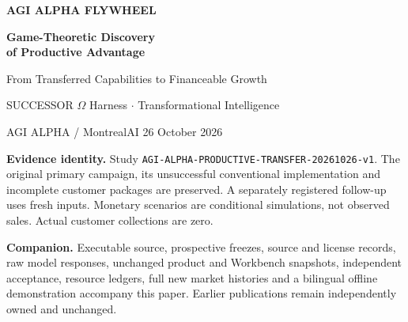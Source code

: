 \documentclass[11pt,a4paper]{article}
\begin{document}
\hypersetup{pageanchor=false}
\begin{titlepage}
\thispagestyle{empty}
\vspace*{12mm}
{\large\bfseries\color{cyan}AGI ALPHA FLYWHEEL}\par
\vspace{8mm}
{\Huge\bfseries\color{cosmic}Game-Theoretic Discovery\\of Productive Advantage}\par
\vspace{6mm}
{\LARGE From Transferred Capabilities to Financeable Growth}\par
\vspace{8mm}
{\large SUCCESSOR $\Omega$ Harness \enspace $\cdot$ \enspace Transformational Intelligence}\par
\vspace{6mm}
{AGI ALPHA / MontrealAI \hfill 26 October 2026}\par
\vspace{9mm}

\vfill
\begin{minipage}{0.96\textwidth}
\color{muted}\small
\textbf{Evidence identity.} Study \texttt{AGI-ALPHA-PRODUCTIVE-TRANSFER-20261026-v1}.
The original primary campaign, its unsuccessful conventional implementation and incomplete customer packages are preserved. A separately registered follow-up uses fresh inputs. Monetary scenarios are conditional simulations, not observed sales. Actual customer collections are zero.
\par\medskip
\textbf{Companion.} Executable source, prospective freezes, source and license records, raw model responses, unchanged product and Workbench snapshots, independent acceptance, resource ledgers, full new market histories and a bilingual offline demonstration accompany this paper. Earlier publications remain independently owned and unchanged.
\end{minipage}
\end{titlepage}
\hypersetup{pageanchor=true}
\end{document}
